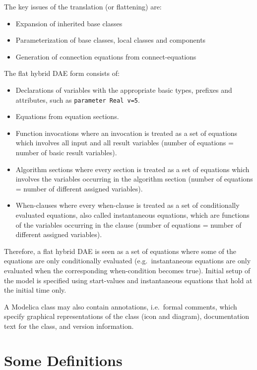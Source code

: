 The key issues of the translation (or flattening) are:
\begin{itemize}
\item
  Expansion of inherited base classes
\item
  Parameterization of base classes, local classes and components
\item
  Generation of connection equations from connect-equations
\end{itemize}

The flat hybrid DAE form consists of:
\begin{itemize}
\item
  Declarations of variables with the appropriate basic types, prefixes
  and attributes, such as \lstinline!parameter Real v=5!.
\item
  Equations from equation sections.
\item
  Function invocations where an invocation is treated as a set of
  equations which involves all input and all result variables (number of
  equations = number of basic result variables).
\item
  Algorithm sections where every section is treated as a set of
  equations which involves the variables occurring in the algorithm
  section (number of equations = number of different assigned
  variables).
\item
  When-clauses where every when-clause is treated as a set of
  conditionally evaluated equations, also called instantaneous
  equations, which are functions of the variables occurring in the
  clause (number of equations = number of different assigned variables).
\end{itemize}

Therefore, a flat hybrid DAE is seen as a set of equations where some of
the equations are only conditionally evaluated (e.g.\ instantaneous
equations are only evaluated when the corresponding when-condition
becomes true). Initial setup of the model is specified using
start-values and instantaneous equations that hold at the initial time
only.

A Modelica class may also contain annotations, i.e.\ formal comments,
which specify graphical representations of the class (icon and diagram),
documentation text for the class, and version information.

\section{Some Definitions}

